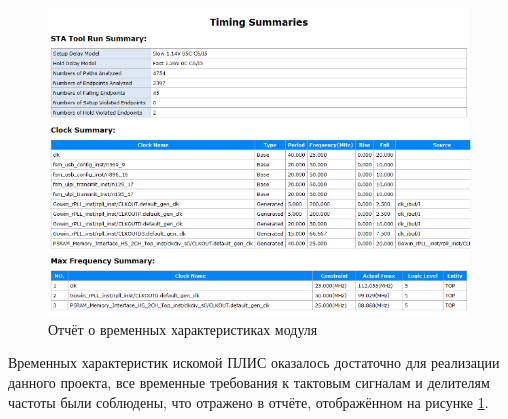 \begin{figure}[ht!]
    \centering
    \includegraphics[scale=0.7]{res/img/synth_timing.png}
    \caption{Отчёт о временных характеристиках модуля}
    \label{fig:synth_timing}
\end{figure}



Временных характеристик искомой ПЛИС оказалось достаточно для реализации данного проекта, все временные требования к тактовым сигналам и делителям частоты были соблюдены, что отражено в отчёте, отображённом на рисунке \ref{fig:synth_timing}.
